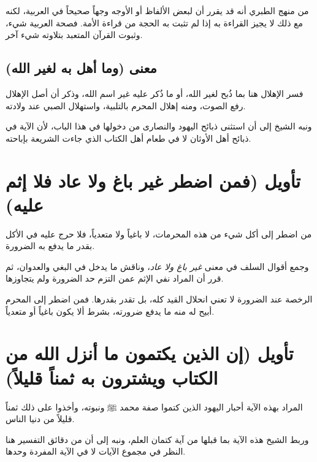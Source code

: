 \begin{fawaid}
من منهج الطبري أنه قد يقرر أن لبعض الألفاظ أو الأوجه وجهاً صحيحاً في العربية، لكنه مع ذلك لا يجيز القراءة به إذا لم تثبت به الحجة من قراءة الأمة. فصحة العربية شيء، وثبوت القرآن المتعبد بتلاوته شيء آخر.
\end{fawaid}

\subsection{معنى (وما أهل به لغير الله)}
فسر  الإهلال هنا بما ذُبح لغير الله، أو ما ذُكر عليه غير اسم الله، وذكر أن أصل الإهلال رفع الصوت، ومنه إهلال المحرم بالتلبية، واستهلال الصبي عند ولادته.

ونبه الشيخ إلى أن  استثنى ذبائح اليهود والنصارى من دخولها في هذا الباب، لأن الآية في ذبائح أهل الأوثان لا في طعام أهل الكتاب الذي جاءت الشريعة بإباحته.

\separator

\section{تأويل (فمن اضطر غير باغ ولا عاد فلا إثم عليه)}
 من اضطر إلى أكل شيء من هذه المحرمات، لا باغياً ولا متعدياً، فلا حرج عليه في الأكل بقدر ما يدفع به الضرورة.

وجمع  أقوال السلف في معنى \textit{غير باغ ولا عاد}، وناقش ما يدخل في البغي والعدوان، ثم قرر أن المراد نفي الإثم عمن التزم حد الضرورة ولم يتجاوزها.

\begin{fawaid}
الرخصة عند الضرورة لا تعني انحلال القيد كله، بل تقدر بقدرها. فمن اضطر إلى المحرم أبيح له منه ما يدفع ضرورته، بشرط ألا يكون باغياً أو متعدياً.
\end{fawaid}

\separator

\section{تأويل (إن الذين يكتمون ما أنزل الله من الكتاب ويشترون به ثمناً قليلاً)}
 المراد بهذه الآية أحبار اليهود الذين كتموا صفة محمد ﷺ ونبوته، وأخذوا على ذلك ثمناً قليلاً من دنيا الناس.

وربط الشيخ هذه الآية بما قبلها من آية كتمان العلم، ونبه إلى أن من دقائق التفسير هنا النظر في مجموع الآيات لا في الآية المفردة وحدها.

